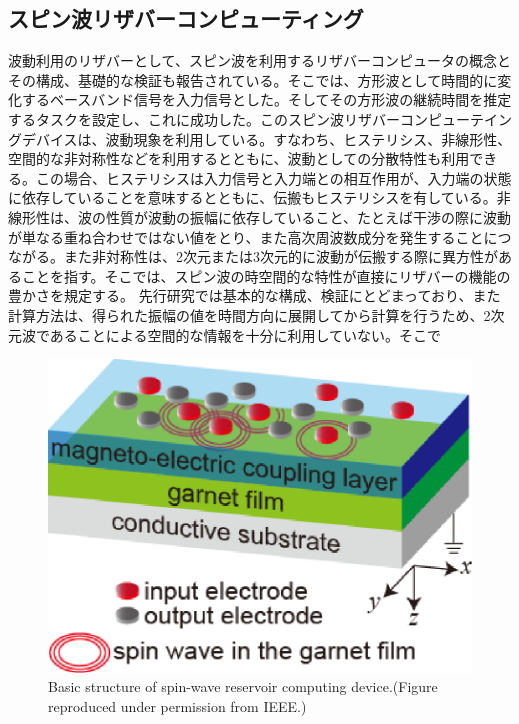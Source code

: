 \documentclass[a4j, twocolumn]{jsarticle}
\begin{document}
\subsection{スピン波リザバーコンピューティング}
波動利用のリザバーとして、スピン波を利用するリザバーコンピュータの概念とその構成、基礎的な検証も報告されている\cite{Nakane2018IEEEAccess:_Reser_Compu_with_spin_waves_Excit_in_a_Garne_film,Nakane2018ICM:_demon_of_spin_wave_based_reser_compu_for_next_gener_machi_learn_devic}。そこでは、方形波として時間的に変化するベースバンド信号を入力信号とした。そしてその方形波の継続時間を推定するタスクを設定し、これに成功した。このスピン波リザバーコンピューテイングデバイスは、波動現象を利用している。すなわち、ヒステリシス、非線形性、空間的な非対称性などを利用するとともに、波動としての分散特性も利用できる。この場合、ヒステリシスは入力信号と入力端との相互作用が、入力端の状態に依存していることを意味するとともに、伝搬もヒステリシスを有している。非線形性は、波の性質が波動の振幅に依存していること、たとえば干渉の際に波動が単なる重ね合わせではない値をとり、また高次周波数成分を発生することにつながる。また非対称性は、2次元または3次元的に波動が伝搬する際に異方性があることを指す。そこでは、スピン波の時空間的な特性が直接にリザバーの機能の豊かさを規定する。
先行研究\cite{Nakane2018IEEEAccess:_Reser_Compu_with_spin_waves_Excit_in_a_Garne_film}では基本的な構成、検証にとどまっており、また計算方法は、得られた振幅の値を時間方向に展開してから計算を行うため、2次元波であることによる空間的な情報を十分に利用していない。そこで

\begin{figure}
\centering
\includegraphics[width=0.9\hsize]{./figures/deviceStructure.eps} 
\caption{Basic structure of spin-wave reservoir computing device.(Figure reproduced under permission from IEEE.)}
\label{fig:basicstrct}
\end{figure}
\end{document}
